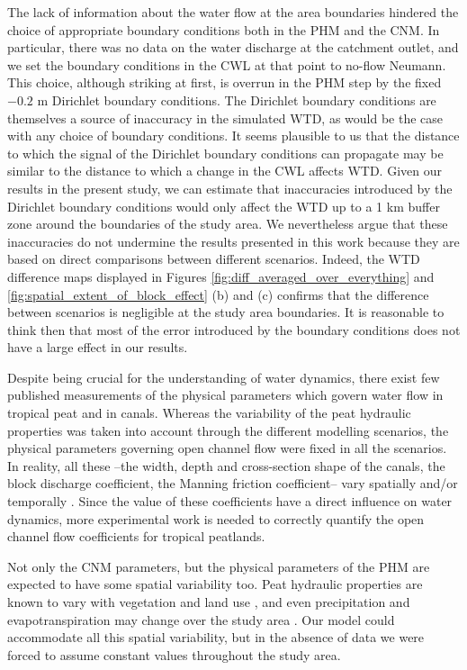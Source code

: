 \documentclass[bg, manuscript]{copernicus}
\begin{document}
The lack of information about the water flow at the area boundaries hindered the choice of appropriate boundary conditions both in the PHM and the CNM.
In particular, there was no data on the water discharge at the catchment outlet, and we set the boundary conditions in the CWL at that point to no-flow Neumann.
This choice, although striking at first, is overrun in the PHM step by the fixed $-0.2$ \unit{m} Dirichlet boundary conditions.
The   Dirichlet boundary conditions are themselves a source of inaccuracy in the simulated WTD, as would be the case with any choice of boundary conditions.
It seems plausible to us that the  distance to which the signal of the Dirichlet boundary conditions can propagate may be similar to the distance to which a change in the CWL affects WTD.
Given our results in the present study, we can estimate that inaccuracies introduced by the Dirichlet boundary conditions would only affect the WTD up to a 1 km buffer zone around the boundaries of the study area.
We nevertheless argue that these inaccuracies do not undermine the results presented in this work because they are based on direct comparisons between different scenarios.
Indeed, the WTD difference maps displayed in Figures \ref{fig:diff_averaged_over_everything} and \ref{fig:spatial_extent_of_block_effect} (b) and (c) confirms that the difference between scenarios is negligible at the study area boundaries.
It is reasonable to think then that most of the error introduced by the boundary conditions does not have a large effect in our results.

Despite being crucial for the understanding of water dynamics, there exist few published measurements of the physical parameters which govern water flow in tropical peat and in canals.
Whereas the variability of the peat hydraulic properties was taken into account through the different modelling scenarios, the physical parameters governing open channel flow were fixed in all the scenarios. 
In reality, all these --the width, depth and cross-section shape of the canals, the block discharge coefficient, the Manning friction coefficient-- vary spatially and/or temporally  \citep{ritzemaCanalBlockingStrategies2014, osakiTropicalPeatlandEcosystems2016}.
Since the value of these coefficients have a direct influence on water dynamics, more experimental work is needed to correctly quantify the open channel flow coefficients for tropical peatlands.

Not only the CNM parameters, but the physical parameters of the PHM are expected to have some spatial variability too.
Peat hydraulic properties are known to vary with vegetation and land use  \citep{bairdHighPermeabilityExplains2017, kurniantoInfluenceLandcoverChanges2019}, and even precipitation and evapotranspiration may change over the study area \citep{vijithSpatialTemporalCharacteristics2020}.
Our model could accommodate all this spatial variability, but in the absence of data we were forced to assume constant values throughout the study area.
\end{document}
